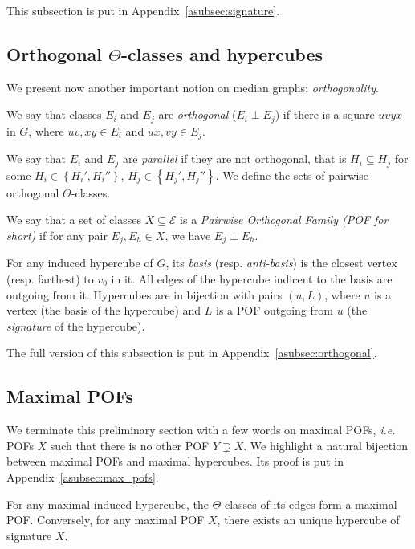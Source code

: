 \documentclass[a4paper,UKenglish,numberwithinsect,cleveref, autoref]{lipics-v2021}
\newcommand{\set}[1]{\left\{ #1 \right\}}
\begin{document}
This subsection is put in Appendix~\ref{asubsec:signature}.

\subsection{Orthogonal $\Theta$-classes and hypercubes}

We present now another important notion on median graphs: \textit{orthogonality}.

\begin{definition}
We say that classes $E_i$ and $E_j$ are {\em orthogonal} ($E_i \perp E_j$) if there is a square $uvyx$ in $G$, where $uv,xy \in E_i$ and $ux,vy \in E_j$.
\end{definition}

We say that $E_i$ and $E_j$ are \textit{parallel} if they are not orthogonal, that is $H_i \subseteq H_j$ for some $H_i \in \set{H_i',H_i''}$, $H_j \in \set{H_j',H_j''}$. 
We define the sets of pairwise orthogonal $\Theta$-classes.

\begin{definition}
We say that a set of classes $X \subseteq \mathcal{E}$ is a {\em Pairwise Orthogonal Family (POF for short)} if for any pair $E_j,E_h \in X$, we have $E_j \perp E_h$.
\end{definition}

For any induced hypercube of $G$, its \textit{basis} (resp. \textit{anti-basis}) is the closest vertex (resp. farthest) to $v_0$ in it. All edges of the hypercube indicent to the basis are outgoing from it. Hypercubes are in bijection with pairs $(u,L)$, where $u$ is a vertex (the basis of the hypercube) and $L$ is a POF outgoing from $u$ (the \textit{signature} of the hypercube).

The full version of this subsection is put in Appendix~\ref{asubsec:orthogonal}.

\subsection{Maximal POFs} \label{subsec:max_pofs}

We terminate this preliminary section with a few words on maximal POFs, {\em i.e.} POFs $X$ such that there is no other POF $Y \supsetneq X$. We highlight a natural bijection between maximal POFs and maximal hypercubes. Its proof is put in Appendix~\ref{asubsec:max_pofs}.

\begin{theorem}[\ref{th:maximal_pofs}]
For any maximal induced hypercube, the $\Theta$-classes of its edges form a maximal POF.
Conversely, for any maximal POF $X$, there exists an unique hypercube of signature $X$. 
\label{th:maximal_pofs_teaser}
\end{theorem}
\end{document}
